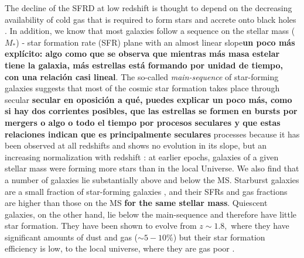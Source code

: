     The decline of the SFRD at low redshift is thought to depend on the decreasing availability of cold gas that is required to form stars and accrete onto black holes \citep[e.g.,][]{2016MNRAS.458L..14F}. In addition, we know that most galaxies follow a sequence on the stellar mass ($M_*$) - star formation rate (SFR) plane with an almost linear slope{\bf un poco más explícito: algo como que se observa que mientras más masa estelar tiene la galaxia, más estrellas está formando por unidad de tiempo, con una relación casi lineal}. The so-called \emph{\textup{main-sequence}} of star-forming galaxies \citep{2004MNRAS.351.1151B, 2007ApJ...670..156D, 2007A&A...468...33E, 2007ApJ...660L..43N, 2014MNRAS.443...19R, 2017MNRAS.465.3390A} suggests that most of the cosmic star formation takes place through secular {\bf secular en oposición a qué, puedes explicar un poco más, como si hay dos corrientes posibles, que las estrellas se formen en bursts por mergers o algo o todo el tiempo por procesos seculares y que estas relaciones indican que es principalmente seculares} processes \citep{2011ApJ...739L..40R} because it has been observed at all redshifts and shows no evolution in its slope, but an increasing normalization with redshift \citep{2015A&A...581A..54T, 2015A&A...575A..74S, 2016ApJ...817..118T}: at earlier epochs, galaxies of a given stellar mass were forming more stars than in the local Universe.
    We also find that a number of galaxies lie substantially above and below the MS.
    Starburst galaxies are a small fraction of star-forming galaxies \citep[$\sim2\%$][]{2011ApJ...739L..40R}, and their SFRs and gas fractions are higher than those on the MS {\bf for the same stellar mass}. 
    Quiescent galaxies, on the other hand, lie below the main-sequence and therefore have little star formation. They have been shown to evolve from $z\sim1.8,$ where they have significant amounts of dust and gas ($\sim5-10\%$) but their star formation efficiency is low, to the local universe, where they are gas poor \citep{2018NatAs...2..239G}.
    
